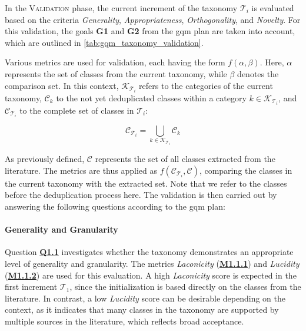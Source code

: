In the \textsc{Validation} phase, the current increment of the taxonomy $\mathcal{T}_i$ is evaluated based on the criteria \emph{Generality}, \emph{Appropriateness}, \emph{Orthogonality}, and \emph{Novelty}. For this validation, the goals \textbf{G1} and \textbf{G2} from the \gls{gqm} plan are taken into account, which are outlined in \autoref{tab:gqm_taxonomy_validation}.

Various metrics are used for validation, each having the form $f(\alpha, \beta)$. Here, $\alpha$ represents the set of classes from the current taxonomy, while $\beta$ denotes the comparison set. In this context, $\mathcal{K}_{\mathcal{T}_i}$ refers to the categories of the current taxonomy, $\mathcal{C}_k$ to the not yet deduplicated classes within a category $k \in \mathcal{K}_{\mathcal{T}_i}$, and $\mathcal{C}_{\mathcal{T}_i}$ to the complete set of classes in $\mathcal{T}_i$:

\[
\mathcal{C}_{\mathcal{T}_i} = \bigcup_{k \in \mathcal{K}_{\mathcal{T}_i}} \mathcal{C}_k
\]

As previously defined, $\mathcal{C}$ represents the set of all classes extracted from the literature. The metrics are thus applied as $f(\mathcal{C}_{\mathcal{T}_i}, \mathcal{C})$, comparing the classes in the current taxonomy with the extracted set. Note that we refer to the classes before the deduplication process here. The validation is then carried out by answering the following questions according to the \gls{gqm} plan:

\paragraph{Generality and Granularity} Question \hyperref[tab:gqm_taxonomy_validation]{\textbf{Q1.1}} investigates whether the taxonomy demonstrates an appropriate level of generality and granularity. The metrics \emph{Laconicity} (\hyperref[tab:gqm_taxonomy_validation]{\textbf{M1.1.1}}) and \emph{Lucidity} (\hyperref[tab:gqm_taxonomy_validation]{\textbf{M1.1.2}}) are used for this evaluation. A high \emph{Laconicity} score is expected in the first increment $\mathcal{T}_1$, since the initialization is based directly on the classes from the literature. In contrast, a low \emph{Lucidity} score can be desirable depending on the context, as it indicates that many classes in the taxonomy are supported by multiple sources in the literature, which reflects broad acceptance.

